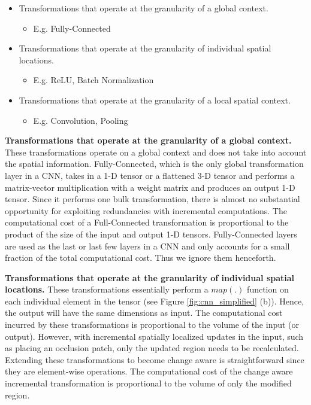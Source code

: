 \begin{itemize}
    \item Transformations that operate at the granularity of a global context.
    \begin{itemize}
     \item E.g. Fully-Connected
    \end{itemize}
	\item Transformations that operate at the granularity of individual  spatial locations.
	\begin{itemize}
	 \item E.g. ReLU, Batch Normalization
	\end{itemize}
	\item Transformations that operate at the granularity of a local spatial context.
	\begin{itemize}
	 \item E.g. Convolution, Pooling
	\end{itemize}
\end{itemize}

\vspace{2mm}
\noindent \textbf{Transformations that operate at the granularity of a global context.} These transformations operate on a global context and does not take into account the spatial information.
Fully-Connected, which is the only global transformation layer in a CNN, takes in a 1-D tensor or a flattened 3-D tensor and performs a matrix-vector multiplication with a weight matrix and produces an output 1-D tensor.
Since it performs one bulk transformation, there is almost no substantial opportunity for exploiting redundancies with incremental computations.
The computational cost of a Full-Connected transformation is proportional to the product of the size of the input and output 1-D tensors.
Fully-Connected layers are used as the last or last few layers in a CNN and only accounts for a small fraction of the total computational cost.
Thus we ignore them henceforth.

\vspace{2mm}
\noindent \textbf{Transformations that operate at the granularity of individual  spatial locations.} These transformations essentially perform a $map(.)$ function on each individual element in the tensor (see Figure \ref{fig:cnn_simplified} (b)).
Hence, the output will have the same dimensions as input.
The computational cost incurred by these transformations is proportional to the volume of the input (or output).
However, with incremental spatially localized updates in the input, such as placing an occlusion patch, only the updated region needs to be recalculated.
Extending these transformations to become change aware is straightforward since they are element-wise operations.
The computational cost of the change aware incremental transformation is proportional to the volume of only the modified region.


